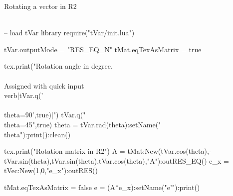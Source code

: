 \documentclass{article}
\begin{document}
Rotating a vector in R2 \\\\
\begin{luacode}
	-- load tVar library
	require("tVar/init.lua")

	tVar.outputMode = "RES_EQ_N"
	tMat.eqTexAsMatrix = true
	
	tex.print("Rotation angle in degree.\\\\ Assigned with quick input \\verb|tVar.q('\\\\theta=90',true)|")
	tVar.q("\\theta=45",true)
	theta = tVar.rad(theta):setName("\\theta"):print():clean()
	
	tex.print("Rotation matrix in R2")
	A = tMat:New({{tVar.cos(theta),-tVar.sin(theta)},{tVar.sin(theta),tVar.cos(theta)}},"A"):outRES_EQ()
	e_x = tVec:New({1,0},"e_x"):outRES()
	
	
	tMat.eqTexAsMatrix = false
	e = (A*e_x):setName("e'"):print()
\end{luacode}
\end{document}
